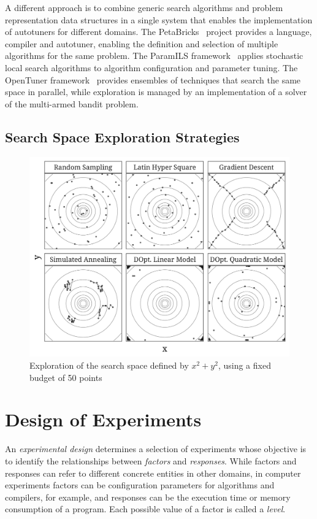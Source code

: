 \documentclass[conference]{IEEEtran}
\begin{document}
A different approach is to combine generic search algorithms and problem
representation data structures in a single system that enables the
implementation of autotuners for different domains. The
PetaBricks~\cite{ansel2009petabricks} project provides a language,
compiler and autotuner, enabling the definition and selection of multiple
algorithms for the same problem. The ParamILS
framework~\cite{hutter2009paramils} applies stochastic local search
algorithms to algorithm configuration and parameter tuning. The OpenTuner
framework~\cite{ansel2014opentuner} provides ensembles of techniques that
search the same space in parallel, while exploration is managed by an
implementation of a solver of the multi-armed bandit problem.
\subsection{Search Space Exploration Strategies}
\label{sec:org75b2da1}
\begin{center}
\begin{figure}[htbp]
\centering
\includegraphics[width=.95\columnwidth]{./img/sampling_comparison.pdf}
\caption{Exploration of the search space defined by \(x^2 + y^2\), using a fixed budget of 50 points}
\end{figure}
\end{center}
\section{Design of Experiments}
\label{sec:org0c81bd2}
An \emph{experimental design} determines a selection of experiments whose objective
is to identify the relationships between \emph{factors} and \emph{responses}. While
factors and responses can refer to different concrete entities in other domains,
in computer experiments factors can be configuration parameters for algorithms
and compilers, for example, and responses can be the execution time or memory
consumption of a program. Each possible value of a factor is called a \emph{level}.
\end{document}
